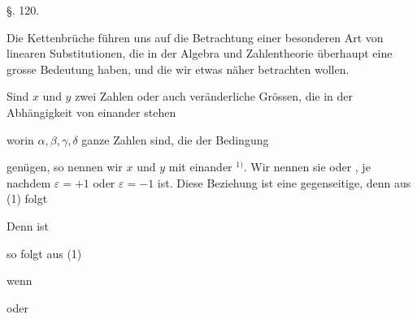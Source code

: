 
\begin{center}
§. 120.

\end{center}

Die Kettenbrüche führen uns auf die Betrachtung einer
besonderen Art von linearen Substitutionen, die in der Algebra
und Zahlentheorie überhaupt eine grosse Bedeutung haben, und
die wir etwas näher betrachten wollen.

Sind $x$ und $y$ zwei Zahlen oder auch veränderliche Grössen,
die in der Abhängigkeit von einander stehen

worin $\alpha, \beta, \gamma, \delta$ ganze Zahlen sind, die der Bedingung

genügen, so nennen wir $x$ und $y$ mit einander $^{1)}$.
Wir nennen sie  oder ,
je nachdem $\varepsilon = +1$ oder $\varepsilon = -1$ ist. Diese Beziehung ist
eine gegenseitige, denn aus (1) folgt


Denn ist

so folgt aus (1)

wenn

oder

\begingroup
\renewcommand{\thefootnote}{1)}
\endgroup
